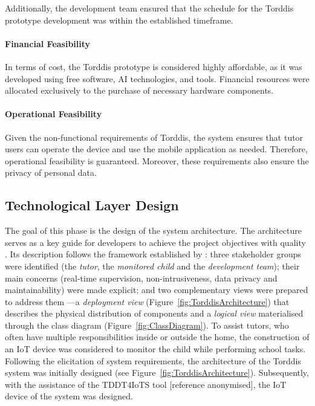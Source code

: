                 Additionally, the development team ensured that the schedule for the Torddis prototype development was within the established timeframe.
                
                \paragraph{Financial Feasibility}
                In terms of cost, the Torddis prototype is considered highly affordable, as it was developed using free software, AI technologies, and tools. Financial resources were allocated exclusively to the purchase of necessary hardware components.
                
                \paragraph{Operational Feasibility}
                Given the non-functional requirements of Torddis, the system ensures that tutor users can operate the device and use the mobile application as needed. Therefore, operational feasibility is guaranteed. Moreover, these requirements also ensure the privacy of personal data.
                
                \subsection{Technological Layer Design}
                The goal of this phase is the design of the system architecture. The architecture serves as a key guide for developers to achieve the project objectives with quality \citep{Liu2011Status}. Its description follows the framework established by \citet{ISO-IEC-IEEE42010-2022}: three stakeholder groups were identified (the \textit{tutor}, the \textit{monitored child} and the \textit{development team}); their main concerns (real-time supervision, non-intrusiveness, data privacy and maintainability) were made explicit; and two complementary views were prepared to address them —a \emph{deployment view} (Figure~\ref{fig:TorddisArchitecture}) that describes the physical distribution of components and a \emph{logical view} materialised through the class diagram (Figure~\ref{fig:ClassDiagram}). To assist tutors, who often have multiple responsibilities inside or outside the home, the construction of an IoT device was considered to monitor the child while performing school tasks. Following the elicitation of system requirements, the architecture of the Torddis system was initially designed (see Figure~\ref{fig:TorddisArchitecture}). Subsequently, with the assistance of the TDDT4IoTS tool [reference anonymised], the IoT device of the system was designed.
                

